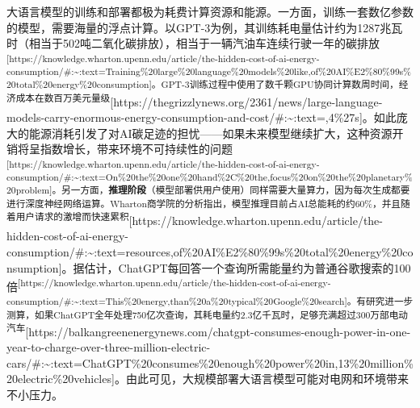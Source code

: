 \documentclass[
  letterpaper,
]{scrbook}
\begin{document}
大语言模型的训练和部署都极为耗费计算资源和能源。一方面，训练一套数亿参数的模型，需要海量的浮点计算。以GPT-3为例，其训练耗电量估计约为1287兆瓦时（相当于502吨二氧化碳排放），相当于一辆汽油车连续行驶一年的碳排放\textsuperscript{{[}https://knowledge.wharton.upenn.edu/article/the-hidden-cost-of-ai-energy-consumption/\#:\textasciitilde:text=Training\%20large\%20language\%20models\%20like,of\%20AI\%E2\%80\%99s\%20total\%20energy\%20consumption{]}。GPT-3训练过程中使用了数千颗GPU协同计算数周时间，经济成本在数百万美元量级}{[}https://thegrizzlynews.org/2361/news/large-language-models-carry-enormous-energy-consumption-and-cost/\#:\textasciitilde:text=,4\%27s{]}。如此庞大的能源消耗引发了对AI碳足迹的担忧------如果未来模型继续扩大，这种资源开销将呈指数增长，带来环境不可持续性的问题\textsuperscript{{[}https://knowledge.wharton.upenn.edu/article/the-hidden-cost-of-ai-energy-consumption/\#:\textasciitilde:text=On\%20the\%20one\%20hand\%2C\%20the,focus\%20on\%20the\%20planetary\%20problem{]}。另一方面，\textbf{推理阶段}（模型部署供用户使用）同样需要大量算力，因为每次生成都要进行深度神经网络运算。Wharton商学院的分析指出，模型推理目前占AI总能耗的约60\%，并且随着用户请求的激增而快速累积}{[}https://knowledge.wharton.upenn.edu/article/the-hidden-cost-of-ai-energy-consumption/\#:\textasciitilde:text=resources,of\%20AI\%E2\%80\%99s\%20total\%20energy\%20consumption{]}。据估计，ChatGPT每回答一个查询所需能量约为普通谷歌搜索的100倍\textsuperscript{{[}https://knowledge.wharton.upenn.edu/article/the-hidden-cost-of-ai-energy-consumption/\#:\textasciitilde:text=This\%20energy,than\%20a\%20typical\%20Google\%20search{]}。有研究进一步测算，如果ChatGPT全年处理750亿次查询，其耗电量约2.3亿千瓦时，足够充满超过300万部电动汽车}{[}https://balkangreenenergynews.com/chatgpt-consumes-enough-power-in-one-year-to-charge-over-three-million-electric-cars/\#:\textasciitilde:text=ChatGPT\%20consumes\%20enough\%20power\%20in,13\%20million\%20electric\%20vehicles{]}。由此可见，大规模部署大语言模型可能对电网和环境带来不小压力。
\end{document}
